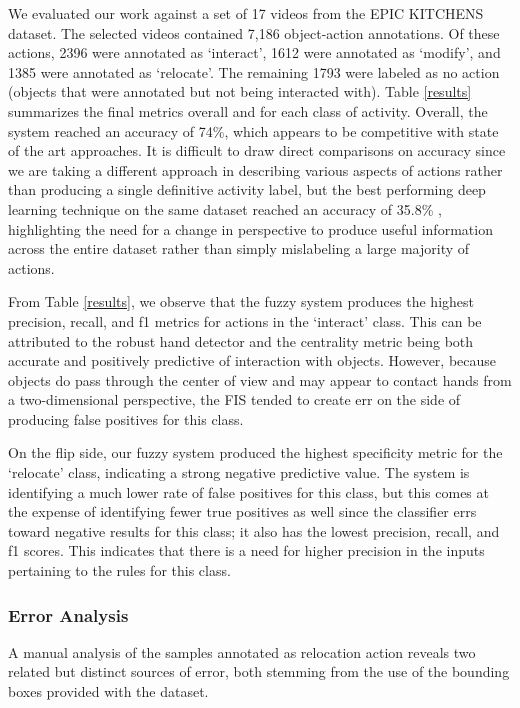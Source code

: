 \documentclass[12pt]{report}
\begin{document}
We evaluated our work against a set of 17 videos from the EPIC KITCHENS dataset. The selected videos contained 7,186 object-action annotations. Of these actions, 2396 were annotated as `interact', 1612 were annotated as `modify', and 1385 were annotated as `relocate'. The remaining 1793 were labeled as no action (objects that were annotated but not being interacted with). Table \ref{results} summarizes the final metrics overall and for each class of activity. Overall, the system reached an accuracy of 74\%, which appears to be competitive with state of the art approaches. It is difficult to draw direct comparisons on accuracy since we are taking a different approach in describing various aspects of actions rather than producing a single definitive activity label, but the best performing deep learning technique on the same dataset reached an accuracy of 35.8\% \cite{Wang2021Self-supervisingDescriptors}, highlighting the need for a change in perspective to produce useful information across the entire dataset rather than simply mislabeling a large majority of actions.

From Table \ref{results}, we observe that the fuzzy system produces the highest precision, recall, and f1 metrics for actions in the `interact' class. This can be attributed to the robust hand detector and the centrality metric being both accurate and positively predictive of interaction with objects. However, because objects do pass through the center of view and may appear to contact hands from a two-dimensional perspective, the FIS tended to create err on the side of producing false positives for this class.

On the flip side, our fuzzy system produced the highest specificity metric for the `relocate' class, indicating a strong negative predictive value. The system is identifying a much lower rate of false positives for this class, but this comes at the expense of identifying fewer true positives as well since the classifier errs toward negative results for this class; it also has the lowest precision, recall, and f1 scores. This indicates that there is a need for higher precision in the inputs pertaining to the rules for this class.

\subsubsection{Error Analysis}
A manual analysis of the samples annotated as relocation action reveals two related but distinct sources of error, both stemming from the use of the bounding boxes provided with the dataset.
\end{document}
